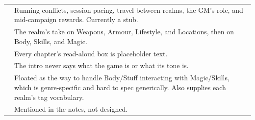 \documentclass[11pt,oneside]{memoir}
\begin{document}
\begin{statblock}
\begin{tabularx}{\linewidth}{@{}p{4.6cm} Y@{}}
 & Running conflicts, session pacing, travel between realms, the GM's role, and mid-campaign rewards. Currently a stub.\\[3pt]
 & The realm's take on Weapons, Armour, Lifestyle, and Locations, then on Body, Skills, and Magic.\\[3pt]
 & Every chapter's read-aloud box is placeholder text.\\[3pt]
 & The intro never says what the game is or what its tone is.\\[3pt]
 & Floated as the way to handle Body/Stuff interacting with Magic/Skills, which is genre-specific and hard to spec generically. Also supplies each realm's tag vocabulary.\\[3pt]
 & Mentioned in the notes, not designed.\\
\end{tabularx}
\end{statblock}
\end{document}
